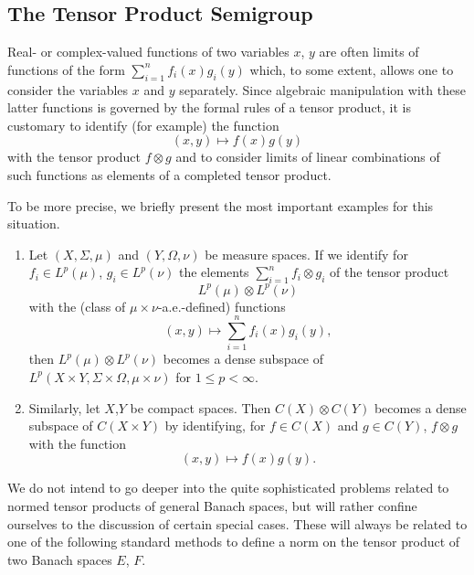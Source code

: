 \subsection{The Tensor Product Semigroup}\label{subsec:a1-3.8}%

Real- or complex-valued functions of two variables $x$, $y$ are often limits of functions of the form $\sum_{i=1}^{n} f_{i}(x)g_{i}(y)$ which, to some extent, allows one to consider the variables $x$ and $y$ separately.
Since algebraic manipulation with these latter functions is governed by the formal rules of a tensor product, it is customary to identify (for example) the function
\[
    (x,y) \mapsto f(x)g(y)
\]
with the tensor product $f \otimes g$ and to consider limits of linear combinations of such functions as elements of a completed tensor product.

To be more precise, we briefly present the most important examples for this situation.
\begin{examples*}\label{ex:a1-5.1}
\begin{enumerate}[\upshape(i), wide, labelindent=.5em]

\item
Let $(X,\Sigma,\mu)$ and $(Y,\Omega,\nu)$ be measure spaces. 
If we identify for $f_{i} \in L^{p}(\mu)$, $g_{i} \in L^{p}(\nu)$ the elements $\sum_{i=1}^{n} f_{i} \otimes g_{i}$ of the tensor product
\[
    L^{p}(\mu) \otimes L^{p}(\nu)
\]
with the (class of $\mu \times \nu$-a.e.-defined) functions
\[
    (x,y) \mapsto \sum_{i=1}^{n} f_{i}(x)g_{i}(y) ,
\]
then $L^{p}(\mu) \otimes L^{p}(\nu)$ becomes a dense subspace of $L^{p}(X\times Y,\Sigma\times\Omega,\mu\times\nu)$ for $1 \leq p < \infty$.

\item
Similarly, let $X$,$Y$ be compact spaces. Then $C(X) \otimes C(Y)$ becomes a dense subspace of $C(X\times Y)$ by identifying, for $f \in C(X)$ and $g \in C(Y)$, $f \otimes g$ with the function
\[
    (x,y) \mapsto f(x)g(y) .
\]
\end{enumerate}
\end{examples*}
We do not intend to go deeper into the quite sophisticated problems related to normed tensor products of general Banach spaces, but will rather confine ourselves to the discussion of certain special cases.
These will always be related to one of the following standard methods to define a norm on the tensor product of two Banach spaces $E$, $F$.

